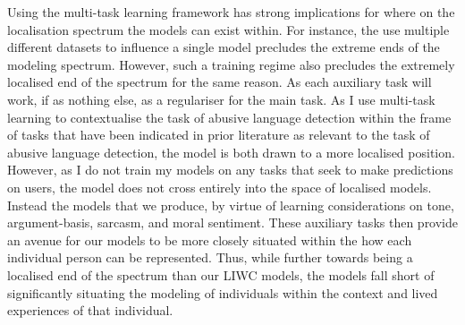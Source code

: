 {Using the multi-task learning framework has strong implications for where on the localisation spectrum the models can exist within. For instance, the use multiple different datasets to influence a single model precludes the extreme ends of the modeling spectrum. However, such a training regime also precludes the extremely localised end of the spectrum for the same reason. As each auxiliary task will work, if as nothing else, as a regulariser for the main task. As I use multi-task learning to contextualise the task of abusive language detection within the frame of tasks that have been indicated in prior literature as relevant to the task of abusive language detection, the model is both drawn to a more localised position.
However, as I do not train my models on any tasks that seek to make predictions on users, the model does not cross entirely into the space of localised models. Instead the models that we produce, by virtue of learning considerations on tone, argument-basis, sarcasm, and moral sentiment. These auxiliary tasks then provide an avenue for our models to be more closely situated within the how each individual person can be represented. Thus, while further towards being a localised end of the spectrum than our LIWC models, the models fall short of significantly situating the modeling of individuals within the context and lived experiences of that individual.
}

